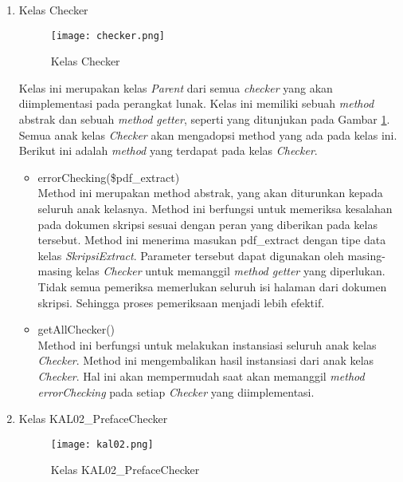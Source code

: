 \begin{enumerate}

	\item Kelas Checker \\
	
	\begin{figure}[H]
	\centering	
	\texttt{[image: checker.png]}
	\caption{Kelas Checker}	
	\label{fig:checker} 
	\end{figure}

	Kelas ini merupakan kelas \textit{Parent} dari semua \textit{checker} yang akan diimplementasi pada perangkat lunak. Kelas ini memiliki sebuah \textit{method} abstrak dan sebuah \textit{method getter}, seperti yang ditunjukan pada Gambar \ref{fig:checker}. Semua anak kelas \textit{Checker} akan mengadopsi method yang ada pada kelas ini. Berikut ini adalah \textit{method} yang terdapat pada kelas \textit{Checker}.
	
		\begin{itemize}
			\item errorChecking(\$pdf\_extract) \\
			Method ini merupakan method abstrak, yang akan diturunkan kepada seluruh anak kelasnya. Method ini berfungsi untuk memeriksa kesalahan pada dokumen skripsi sesuai dengan peran yang diberikan pada kelas tersebut. Method ini menerima masukan pdf\_extract dengan tipe data kelas \textit{SkripsiExtract}. Parameter tersebut dapat digunakan oleh masing-masing kelas \textit{Checker} untuk memanggil \textit{method getter} yang diperlukan. Tidak semua pemeriksa memerlukan seluruh isi halaman dari dokumen skripsi. Sehingga proses pemeriksaan menjadi lebih efektif.		
			
			\item getAllChecker() \\
			Method ini berfungsi untuk melakukan instansiasi seluruh anak kelas \textit{Checker}. Method ini mengembalikan hasil instansiasi dari anak kelas \textit{Checker}. Hal ini akan mempermudah saat akan memanggil \textit{method errorChecking} pada setiap \textit{Checker} yang diimplementasi.
		\end{itemize}
	
	\item Kelas KAL02\_PrefaceChecker \\
	
	\begin{figure}[H]
	\centering	
	\texttt{[image: kal02.png]}
	\caption{Kelas KAL02\_PrefaceChecker}	
	\label{fig:kal02} 
	\end{figure}
	

\end{enumerate}
